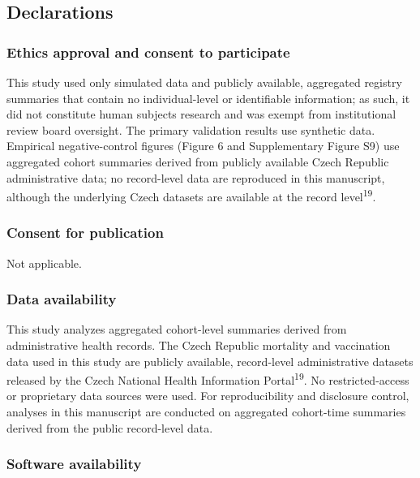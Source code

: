 \documentclass[
]{article}
\begin{document}
\subsection{Declarations}\label{declarations}

\subsubsection{Ethics approval and consent to participate}\label{ethics-approval-and-consent-to-participate}

This study used only simulated data and publicly available, aggregated registry summaries that contain no individual-level or identifiable information; as such, it did not constitute human subjects research and was exempt from institutional review board oversight. The primary validation results use synthetic data. Empirical negative-control figures (Figure 6 and Supplementary Figure S9) use aggregated cohort summaries derived from publicly available Czech Republic administrative data; no record-level data are reproduced in this manuscript, although the underlying Czech datasets are available at the record level\textsuperscript{19}.

\subsubsection{Consent for publication}\label{consent-for-publication}

Not applicable.

\subsubsection{Data availability}\label{data-availability}

This study analyzes aggregated cohort-level summaries derived from administrative health records. The Czech Republic mortality and vaccination data used in this study are publicly available, record-level administrative datasets released by the Czech National Health Information Portal\textsuperscript{19}. No restricted-access or proprietary data sources were used. For reproducibility and disclosure control, analyses in this manuscript are conducted on aggregated cohort-time summaries derived from the public record-level data.

\subsubsection{Software availability}\label{software-availability}
\end{document}
